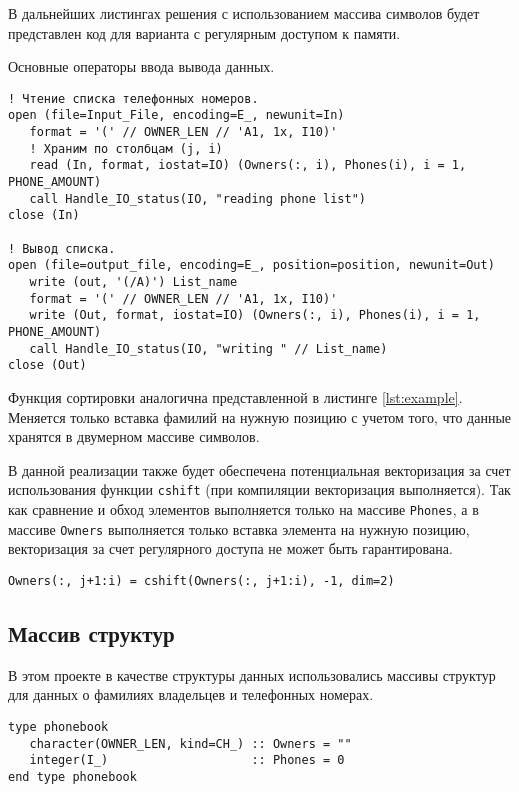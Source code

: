 \documentclass[a4paper,14pt]{article}
\begin{document}
В дальнейших листингах решения с использованием массива символов будет представлен код для варианта с регулярным доступом к памяти.

Основные операторы ввода вывода данных.
\begin{lstlisting}[caption={Ввод и вывод данных}]
! Чтение списка телефонных номеров.
open (file=Input_File, encoding=E_, newunit=In)
   format = '(' // OWNER_LEN // 'A1, 1x, I10)'
   ! Храним по столбцам (j, i)
   read (In, format, iostat=IO) (Owners(:, i), Phones(i), i = 1, PHONE_AMOUNT)
   call Handle_IO_status(IO, "reading phone list")
close (In)

! Вывод списка.
open (file=output_file, encoding=E_, position=position, newunit=Out)
   write (out, '(/A)') List_name
   format = '(' // OWNER_LEN // 'A1, 1x, I10)'
   write (Out, format, iostat=IO) (Owners(:, i), Phones(i), i = 1, PHONE_AMOUNT)
   call Handle_IO_status(IO, "writing " // List_name)
close (Out)
\end{lstlisting}

Функция сортировки аналогична представленной в листинге \ref{lst:example}. Меняется только вставка фамилий на нужную позицию с учетом того, что данные хранятся в двумерном массиве символов. 

В данной реализации также будет обеспечена потенциальная векторизация за счет использования функции \texttt{cshift} (при компиляции векторизация выполняется). Так как сравнение и обход элементов выполняется только на массиве \texttt{Phones}, а в массиве \texttt{Owners} выполняется только вставка элемента на нужную позицию, векторизация за счет регулярного доступа не может быть гарантирована.

\begin{lstlisting}[caption={Сортировка массива символов}]
Owners(:, j+1:i) = cshift(Owners(:, j+1:i), -1, dim=2)
\end{lstlisting}

\subsection{Массив структур}

В этом проекте в качестве структуры данных использовались массивы структур для данных о фамилиях владельцев и телефонных номерах.

\begin{lstlisting}[caption={Структура для хранения данных}]
type phonebook
   character(OWNER_LEN, kind=CH_) :: Owners = ""
   integer(I_)                    :: Phones = 0
end type phonebook
\end{lstlisting}
\end{document}
